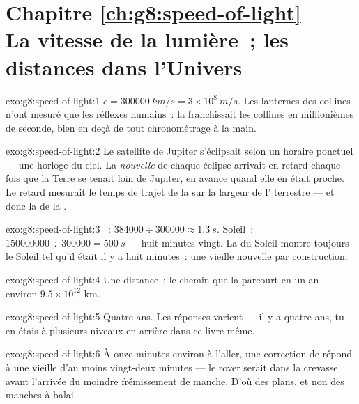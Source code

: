 \section*{Chapitre \ref{ch:g8:speed-of-light} --- La vitesse de la lumière~; les distances dans l'Univers}

\begin{solution}{exo:g8:speed-of-light:1}
$c = \qty{300000}{km/s} = 3 \times 10^{8}\ \unit{m/s}$. Les lanternes
des collines n'ont mesuré que les réflexes humains~: la 
franchissait les collines en millionièmes de seconde, bien en deçà de
tout chronométrage à la main.
\end{solution}

\begin{solution}{exo:g8:speed-of-light:2}
Le satellite de Jupiter s'éclipsait selon un horaire ponctuel --- une
horloge du ciel. La \emph{nouvelle} de chaque éclipse arrivait en
retard chaque fois que la Terre se tenait loin de Jupiter, en avance
quand elle en était proche. Le retard mesurait le temps de trajet de
la  sur la largeur de l' terrestre --- et donc la 
de la .
\end{solution}

\begin{solution}{exo:g8:speed-of-light:3}
~: $384000 \div 300000 \approx \qty{1.3}{s}$. Soleil~:
$150000000 \div 300000 = \qty{500}{s}$ --- huit minutes vingt. La
 du Soleil montre toujours le Soleil tel qu'il était il y a
huit minutes~: une vieille nouvelle par construction.
\end{solution}

\begin{solution}{exo:g8:speed-of-light:4}
Une distance~: le chemin que la  parcourt en un an --- environ
$9.5 \times 10^{12}$ km.
\end{solution}

\begin{solution}{exo:g8:speed-of-light:5}
Quatre ans. Les réponses varient --- il y a quatre ans, tu en étais à
plusieurs niveaux en arrière dans ce livre même.
\end{solution}

\begin{solution}{exo:g8:speed-of-light:6}
À onze minutes environ à l'aller, une correction de  répond
à une  vieille d'au moins vingt-deux minutes --- le rover serait
dans la crevasse avant l'arrivée du moindre frémissement de manche.
D'où des plans, et non des manches à balai.
\end{solution}

